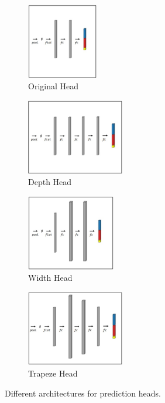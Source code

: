\begin{figure}[H]
    \centering
    \begin{subfigure}[t]{0.21\textwidth}
        \centering
        \includegraphics[height=3.3cm, keepaspectratio]{PICs/improvedModel/originalHead.jpg}
        \caption{Original Head \cite{tepNet2024}}
        \label{fig:predHeadOriginal}
    \end{subfigure}
    \begin{subfigure}[t]{0.27\textwidth}
        \centering
        \includegraphics[height=3.3cm, keepaspectratio]{PICs/improvedModel/depthHead.jpg}
        \caption{Depth Head}
        \label{fig:predHeadDepth}
    \end{subfigure}
    \begin{subfigure}[t]{0.24\textwidth}
        \centering
        \includegraphics[height=3.3cm, keepaspectratio]{PICs/improvedModel/widthHead.jpg}
        \caption{Width Head}
        \label{fig:predHeadWidth}
    \end{subfigure}
    \begin{subfigure}[t]{0.26\textwidth}
        \centering
        \includegraphics[height=3.3cm, keepaspectratio]{PICs/improvedModel/trapezHead.jpg}
        \caption{Trapeze Head}
        \label{fig:predHeadTrapez}
    \end{subfigure}
    \caption{Different architectures for prediction heads.}
    \label{fig:differentpredHeads}
\end{figure}

